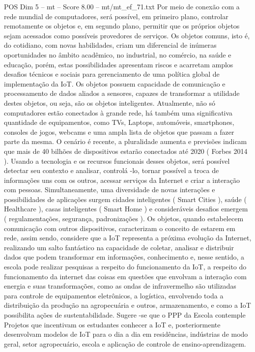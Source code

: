 \begin{textsample}{POS Dim 5 – mt – Score 8.00 – mt/mt\_ef\_71.txt}
Por meio de conexão com a rede mundial de computadores, será possível, em primeiro plano, controlar remotamente os objetos e, em segundo plano, permitir que os próprios objetos sejam acessados como possíveis provedores de serviços.
Os objetos comuns, isto é, do cotidiano, com novas habilidades, criam um diferencial de inúmeras oportunidades no âmbito acadêmico, no industrial, no comércio, na saúde e educação, porém, estas possibilidades apresentam riscos e acarretam amplos desafios técnicos e sociais para gerenciamento de uma política global de implementação da IoT.
Os objetos possuem capacidade de comunicação e processamento de dados aliados a sensores, capazes de transformar a utilidade destes objetos, ou seja, são os objetos inteligentes.
Atualmente, não só computadores estão conectados à grande rede, há também uma significativa quantidade de equipamentos, como TVs, Laptops, automóveis, smartphones, consoles de jogos, webcams e uma ampla lista de objetos que passam a fazer parte da mesma.
O cenário é recente, a pluralidade aumenta e previsões indicam que mais de 40 bilhões de dispositivos estarão conectados até 2020 ( Forbes 2014 ).
Usando a tecnologia e os recursos funcionais desses objetos, será possível detectar seu contexto e analisar, controlá -lo, tornar possível a troca de informações uns com os outros, acessar serviços da Internet e criar a interação com pessoas.
Simultaneamente, uma diversidade de novas interações e possibilidades de aplicações surgem cidades inteligentes ( Smart Cities ), saúde ( Healthcare ), casas inteligentes ( Smart Home ) e consideráveis desafios emergem ( regulamentações, segurança, padronizações ).
Os objetos, quando estabelecem comunicação com outros dispositivos, caracterizam o conceito de estarem em rede, assim sendo, considere que a IoT representa a próxima evolução da Internet, realizando um salto fantástico na capacidade de coletar, analisar e distribuir dados que podem transformar em informações, conhecimento e, nesse sentido, a escola pode realizar pesquisas a respeito do funcionamento da IoT, a respeito do funcionamento da internet das coisas em questões que envolvam a interação com energia e suas transformações, como as ondas de infravermelho são utilizadas para controle de equipamentos eletrônicos, a logística, envolvendo toda a distribuição da produção na agropecuária e outros, armazenamento, e como a IoT possibilita ações de sustentabilidade.
Sugere -se que o PPP da Escola contemple Projetos que incentivam os estudantes conhecer a IoT e, posteriormente desenvolvam modelos de IoT para o dia a dia em residências, indústrias de modo geral, setor agropecuário, escola e aplicação de controle de ensino-aprendizagem.

\end{textsample}

